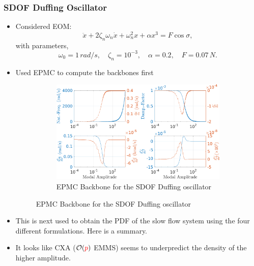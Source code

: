 \documentclass[11pt]{article}
\begin{document}
\subsubsection{SDOF Duffing Oscillator}
\label{sec:org9b10f29}
\begin{itemize}
\item Considered EOM:
$$ \ddot{x} + 2\zeta_n\omega_n \dot{x}+\omega_n^2x + \alpha x^3=F\cos\sigma, $$
with parameters,
$$ \omega_0=1\,rad/s,\quad \zeta_n=10^{-3},\quad \alpha=0.2,\quad F=0.07\,N. $$
\item Used EPMC to compute the backbones first
\begin{figure}
\begin{figure}[htbp]
\centering
\includegraphics[width=.9\linewidth]{FIGS/G1_SDOFEPMC_duffing.png}
\caption{EPMC Backbone for the SDOF Duffing oscillator}
\end{figure}
\end{figure}
\item This is next used to obtain the PDF of the slow flow system using the four different formulations. Here is a summary.
\item It looks like CXA (\(\mathcal{O}(\textcolor{red}{p})\) EMMS) seems to underpredict the density of the higher amplitude.
\end{itemize}
\end{document}
